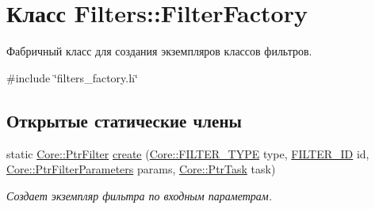\hypertarget{class_filters_1_1_filter_factory}{}\section{Класс Filters\+:\+:Filter\+Factory}
\label{class_filters_1_1_filter_factory}


Фабричный класс для создания экземпляров классов фильтров.  




{\ttfamily \#include \char`\"{}filters\+\_\+factory.\+h\char`\"{}}

\subsection*{Открытые статические члены}
\begin{DoxyCompactItemize}
\item 
static \hyperlink{namespace_core_afba80c2cb714c7d5793d9bcb9591e156}{Core\+::\+Ptr\+Filter} \hyperlink{class_filters_1_1_filter_factory_a404c33c0459c3997d4ad7d488580f404}{create} (\hyperlink{namespace_core_af88278693f3c866f217da796f4bb9af7}{Core\+::\+F\+I\+L\+T\+E\+R\+\_\+\+T\+Y\+PE} type, \hyperlink{namespace_filters_a1b615faac44ef992d0af44da40ff26d7}{F\+I\+L\+T\+E\+R\+\_\+\+ID} id, \hyperlink{namespace_core_a4811af8148ba137d644b9a61a042cf03}{Core\+::\+Ptr\+Filter\+Parameters} params, \hyperlink{namespace_core_abfda8f69fcacfcea2696549b548ed737}{Core\+::\+Ptr\+Task} task)
\begin{DoxyCompactList}\small\item\em Создает экземпляр фильтра по входным параметрам. \end{DoxyCompactList}\end{DoxyCompactItemize}

